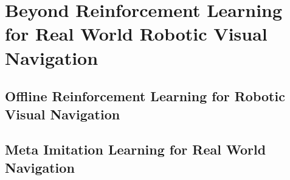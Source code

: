 \chapter{Beyond Reinforcement Learning for Real World Robotic Visual Navigation}\label{ch:rl4rvsn}

\section{Offline Reinforcement Learning for Robotic Visual Navigation}\label{sec:offline_rl4rvsn}






\section{Meta Imitation Learning for Real World Navigation}\label{sec:meta-reinforcement-learning-for-real-world-navigation}




